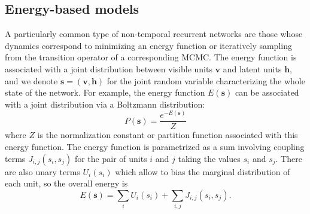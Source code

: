 \documentclass{article}
\newcommand   \vv{{\bm v}}
\newcommand   \vh{{\bm h}}
\newcommand   \vs{{\bm s}}
\begin{document}
\subsection{Energy-based models}

A particularly common type of non-temporal recurrent networks are those
whose dynamics correspond to minimizing an energy function or iteratively sampling
from the transition operator of a corresponding MCMC.
The energy function is associated with a joint distribution between visible units $\vv$
and latent units $\vh$, and we denote $\vs=(\vv,\vh)$ for
the joint random variable characterizing the whole state of the network.
For example, the energy function $E(\vs)$ can be associated with a joint distribution
via a Boltzmann distribution:
\begin{equation}
  P(\vs) = \frac{e^{-E(\vs)}}{Z}
\end{equation}
where $Z$ is the normalization constant or partition function associated with this
energy function. The energy function is parametrized as a sum involving coupling terms
$J_{i,j}(s_i,s_j)$ for the pair of units $i$ and $j$ taking the values $s_i$ and $s_j$.
There are also unary terms $U_i(s_i)$ which allow to bias the marginal distribution
of each unit, so the overall energy is
\begin{equation}
  E(\vs) = \sum_i U_i(s_i) + \sum_{i,j} J_{i,j}(s_i,s_j).
\end{equation}
\end{document}
